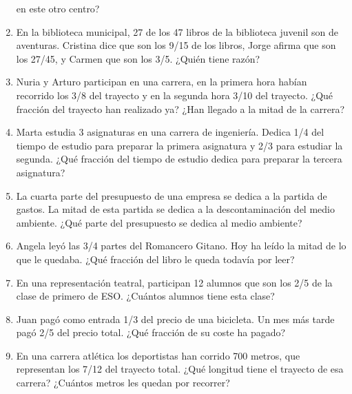 \documentclass[10pt,twoside]{article}
\begin{document}
\begin{enumerate}
en este otro centro?
\item En la biblioteca municipal, 27 de los 47 libros de la biblioteca juvenil son de aventuras. Cristina dice que son los 9/15 de los libros, Jorge afirma que son los 27/45, y Carmen que son los 3/5. ¿Quién tiene razón?
\item Nuria y Arturo participan en una carrera, en la primera hora habían recorrido los 3/8 del trayecto y en la segunda hora 3/10 del trayecto. ¿Qué fracción del trayecto han realizado ya? ¿Han llegado a la mitad de la carrera?
\item Marta estudia 3 asignaturas en una carrera de ingeniería. Dedica 1/4 del tiempo de estudio para preparar la primera asignatura y 2/3 para estudiar la segunda. ¿Qué fracción del tiempo de estudio dedica para preparar la tercera asignatura?
\item La cuarta parte del presupuesto de una empresa se dedica a la partida de gastos. La mitad de esta partida se dedica a la descontaminación del medio ambiente. ¿Qué parte del presupuesto se dedica al medio ambiente?
\item Angela leyó las 3/4 partes del Romancero Gitano. Hoy ha leído la mitad de lo que le quedaba. ¿Qué fracción del libro le queda todavía por leer?
\item En una representación teatral, participan 12 alumnos que son los 2/5 de la clase de primero de ESO. ¿Cuántos alumnos tiene esta clase?
\item Juan pagó como entrada 1/3 del precio de una bicicleta. Un mes más tarde pagó 2/5 del precio total. ¿Qué fracción de su coste ha pagado?
\item En una carrera atlética los deportistas han corrido 700 metros, que representan los 7/12 del trayecto total. ¿Qué longitud tiene el trayecto de esa carrera? ¿Cuántos metros les quedan por recorrer?
\end{enumerate}
\end{document}
